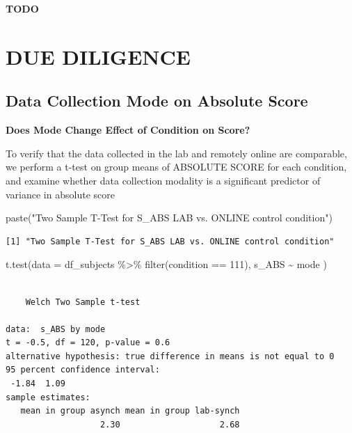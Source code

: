 \documentclass[
  letterpaper,
  DIV=11,
  numbers=noendperiod]{scrreprt}
\newenvironment{Shaded}{\begin{snugshade}}{\end{snugshade}}
\newcommand{\AttributeTok}[1]{\textcolor[rgb]{0.40,0.45,0.13}{#1}}
\newcommand{\DecValTok}[1]{\textcolor[rgb]{0.68,0.00,0.00}{#1}}
\newcommand{\FunctionTok}[1]{\textcolor[rgb]{0.28,0.35,0.67}{#1}}
\newcommand{\NormalTok}[1]{\textcolor[rgb]{0.00,0.23,0.31}{#1}}
\newcommand{\SpecialCharTok}[1]{\textcolor[rgb]{0.37,0.37,0.37}{#1}}
\newcommand{\StringTok}[1]{\textcolor[rgb]{0.13,0.47,0.30}{#1}}
\begin{document}
\textbf{TODO}

\hypertarget{due-diligence}{%
\section{DUE DILIGENCE}\label{due-diligence}}

\hypertarget{data-collection-mode-on-absolute-score}{%
\subsection{Data Collection Mode on Absolute
Score}\label{data-collection-mode-on-absolute-score}}

\textbf{Does Mode Change Effect of Condition on Score?}

To verify that the data collected in the lab and remotely online are
comparable, we perform a t-test on group means of ABSOLUTE SCORE for
each condition, and examine whether data collection modality is a
significant predictor of variance in absolute score

\begin{Shaded}
\begin{Highlighting}[]
\FunctionTok{paste}\NormalTok{(}\StringTok{"Two Sample T{-}Test for S\_ABS LAB vs. ONLINE control condition"}\NormalTok{)}
\end{Highlighting}
\end{Shaded}

\begin{verbatim}
[1] "Two Sample T-Test for S_ABS LAB vs. ONLINE control condition"
\end{verbatim}

\begin{Shaded}
\begin{Highlighting}[]
\FunctionTok{t.test}\NormalTok{(}\AttributeTok{data =}\NormalTok{ df\_subjects }\SpecialCharTok{\%\textgreater{}\%} \FunctionTok{filter}\NormalTok{(condition }\SpecialCharTok{==} \DecValTok{111}\NormalTok{), s\_ABS }\SpecialCharTok{\textasciitilde{}}\NormalTok{ mode )}
\end{Highlighting}
\end{Shaded}

\begin{verbatim}

    Welch Two Sample t-test

data:  s_ABS by mode
t = -0.5, df = 120, p-value = 0.6
alternative hypothesis: true difference in means is not equal to 0
95 percent confidence interval:
 -1.84  1.09
sample estimates:
   mean in group asynch mean in group lab-synch 
                   2.30                    2.68 
\end{verbatim}
\end{document}
